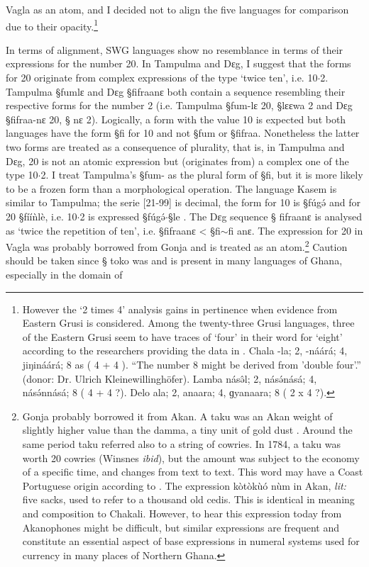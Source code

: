 Vagla as an atom, and I decided  not to align the five languages  for
comparison due to their opacity.\footnote{However the `2 times 4' analysis gains
in pertinence when
 evidence from  Eastern Grusi is considered.  Among the twenty-three Grusi
languages,  three of the Eastern Grusi seem to have traces of `four' in their
word for `eight' according to the researchers providing the data in
\cite{Chan09}.  Chala {\F -la}; 2,   {\F -náárá}; 4,   {\F
jiŋináárá}; 8  as ( 4 + 4 ). ``The number 8 might be derived from 'double
four'.'' (donor: Dr.  Ulrich Kleinewillinghöfer).  Lamba  {\F násə̂l}; 2, {\F
násə́násá}; 4,  {\F násə́nnásá}; 8 ( 4 + 4 ?).  Delo  {\F ala}; 2, {\F
anaara}; 4,  {\F ɡyanaara}; 8 ( 2 x 4 ?).}



In terms of alignment,  SWG languages show no resemblance in terms of 
their expressions for the number 20. In Tampulma  and Dɛg, I suggest that
the forms for 20 originate from complex expressions of the type  `twice ten',
i.e. 10$\cdot$2.   Tampulma {\S fumlɛ} and Dɛg {\S fifraanɛ}  both contain a
sequence resembling their
respective forms for the number 2  (i.e. Tampulma {\S fum-lɛ} 20, {\S  lɛɛwa} 2
and Dɛg
{\S fifraa-nɛ} 20, {\S
nɛ} 2).  Logically, a form with the value 10 is expected but
both
languages have the form {\S fi} for 10 and not {\S fum} or {\S fifraa}.
Nonetheless the
latter two forms are treated as a consequence of plurality, that is, in Tampulma
and Dɛg, 20 is not an atomic expression but (originates from) a complex one of
the type 
10$\cdot$2.  I  treat  Tampulma's  {\S fum-} as the plural form of {\S fi},
but it is more likely to be  a frozen form than a morphological
operation. The language Kasem is similar to Tampulma; the serie [21-99] is
decimal, the
form for 10 is {\S fúgə́}  and for 20 {\S  fííǹlè}, i.e. 10$\cdot$2 is
expressed {\S fúgə́}$\cdot${\S le} \citep[158]{Bonv88}. The Dɛg sequence
{\S
fifraanɛ} is analysed as  `twice the repetition of ten', i.e. {\S fifraanɛ} <
{\S fi$\sim$fi anɛ}.   The expression for 20 in Vagla was probably borrowed from
Gonja and is treated as an atom.\footnote{Gonja probably borrowed it from Akan.
A {\F taku}  was an Akan weight of slightly higher value than the {\F damma},  a
tiny unit of gold dust \citep[117.fn16]{Wins07}. Around  the same period {\F
taku} referred also to a string of cowries. In 1784, a {\F taku} was worth 20
cowries (Winsnes {\it ibid}), but the amount was subject to the economy of a
specific time, and changes from text to text.   This word may have a Coast
Portuguese origin according to \citet[333]{John70b}.  The expression {\F
kòtòkùó nùm} in Akan, {\it lit:} five sacks, used to refer to a thousand
old cedis. This is identical in meaning and composition to Chakali. However, to
hear this expression today from Akanophones might be difficult,
but similar expressions are frequent and constitute an essential aspect of  base
expressions in numeral systems used for currency in many places of Northern
Ghana.} Caution should be taken since {\S
toko} was and is present in many languages of Ghana, especially in the domain of
